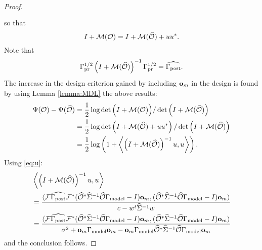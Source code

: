 \documentclass{amsart}
\numberwithin{equation}{section}
\begin{document}
\begin{proof}
\begin{align}
\begin{split}
    \end{split}
  \end{align}
  so that
  \begin{equation}\label{eq:M plus I}
    I + \mathcal{M}( \mathcal{O} ) = I + \mathcal{M} (\widehat{\mathcal{O}} ) + uu^*.
  \end{equation}
  Note that
  \begin{equation}\label{eq:M postcov}
    \Gamma_{\textup{pr}}^{1/2} \left (I + \mathcal{M}( \widehat{\mathcal{O}} ) \right )^{-1} \Gamma_{\textup{pr}}^{1/2} = \widehat{\Gamma_{\textup{post}}}.
  \end{equation}
  The increase in the design criterion gained by including $\mathbf{o}_m$
  in the design is found by using Lemma \ref{lemma:MDL} the above
  results:
  \begin{align*}
    \Psi( \mathcal{O} ) - \Psi( \widehat{\mathcal{O}} )
    &= \frac12 \log \det \Big ( I + \mathcal{M} ( \mathcal{O} ) \Big ) / \det \Big ( I + \mathcal{M} (\widehat{\mathcal{O}}) \Big ) \\
    &= \frac12  \log \det \left ( I + \mathcal{M}(\widehat{\mathcal{O}}) + uu^* \right ) / \det \Big ( I + \mathcal{M} (\widehat{\mathcal{O}}) \Big ) \\
    &= \frac12 \log \left ( 1 + \left \langle \left ( I+\mathcal{M}(\widehat{\mathcal{O}}) \right )^{-1} u, u  \right \rangle \right ).
  \end{align*}
  Using \eqref{eq:u}:
  \begin{align*}
    &\left \langle \left (I+\mathcal{M} (\widehat{\mathcal{O}})\right )^{-1}u, u \right \rangle\\
    &= \frac{
      \langle \mathcal{F} \widehat{\Gamma_{\textup{post}}} \mathcal{F}^* (\widehat{\mathcal{O}}^* \widehat{\Sigma}^{-1} \widehat{\mathcal{O}} \Gamma_{\textup{model}} - I ) \mathbf{o}_m,
      (\widehat{\mathcal{O}}^* \widehat{\Sigma}^{-1} \widehat{\mathcal{O}} \Gamma_{\textup{model}} - I ) \mathbf{o}_m \rangle
    }{
      c- w^t \widehat{\Sigma}^{-1} w
    }\\
    &= 
    \frac{
      \langle \mathcal{F} \widehat{\Gamma_{\textup{post}}} \mathcal{F}^* (\widehat{\mathcal{O}}^* \widehat{\Sigma}^{-1} \widehat{\mathcal{O}} \Gamma_{\textup{model}} - I ) \mathbf{o}_m,
      (\widehat{\mathcal{O}}^* \widehat{\Sigma}^{-1} \widehat{\mathcal{O}} \Gamma_{\textup{model}} - I ) \mathbf{o}_m \rangle
    }{
      \sigma^2 + \mathbf{o}_m \Gamma_{\textup{model}} \mathbf{o}_m - \mathbf{o}_m \Gamma_{\textup{model}} \widehat{\mathcal{O}}^* \widehat{\Sigma}^{-1} \widehat{\mathcal{O}} \Gamma_{\textup{model}} \mathbf{o}_m 
    }
  \end{align*}
  and the conclusion follows.
\end{proof}
\end{document}
